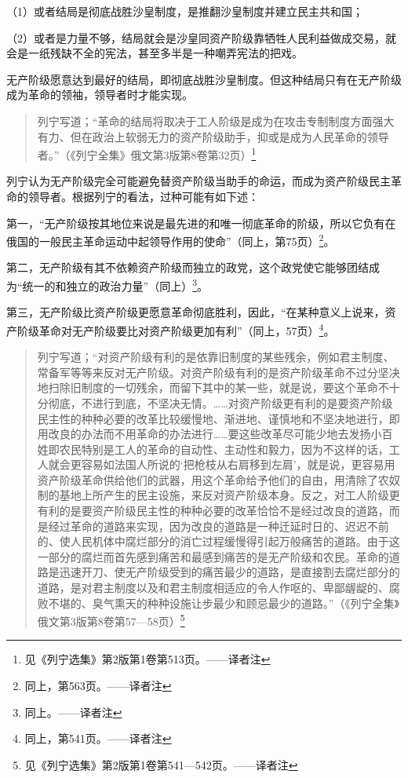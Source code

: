 （1）或者结局是彻底战胜沙皇制度，是推翻沙皇制度并建立民主共和国；

（2）或者是力量不够，结局就会是沙皇同资产阶级靠牺牲人民利益做成交易，就会是一纸残缺不全的宪法，甚至多半是一种嘲弄宪法的把戏。

无产阶级愿意达到最好的结局，即彻底战胜沙皇制度。但这种结局只有在无产阶级成为革命的领袖，领导者时才能实现。

\begin{quotation}
列宁写道；“革命的结局将取决于工人阶级是成为在攻击专制制度方面强大有力、但在政治上软弱无力的资产阶级助手，抑或是成为人民革命的领导者。”（《列宁全集》俄文第3版第8卷第32页）\footnote{见《列宁选集》第2版第1卷第513页。——译者注}
\end{quotation}

列宁认为无产阶级完全可能避免替资产阶级当助手的命运，而成为资产阶级民主革命的领导者。根据列宁的看法，过种可能有如下述：

第一，“无产阶级按其地位来说是最先进的和唯一彻底革命的阶级，所以它负有在俄国的一般民主革命运动中起领导作用的使命”（同上，第75页）\footnote{同上，第563页。——译者注}。

第二，无产阶级有其不依赖资产阶级而独立的政党，这个政党使它能够团结成为“统一的和独立的政治力量”（同上）\footnote{同上。——译者注}。

第三，无产阶级比资产阶级更愿意革命彻底胜利，因此，“在某种意义上说来，资产阶级革命对无产阶级要比对资产阶级更加有利”（同上，57页）\footnote{同上，第541页。——译者注}。

\begin{quotation}
列宁写道；“对资产阶级有利的是依靠旧制度的某些残余，例如君主制度、常备军等等来反对无产阶级。对资产阶级有利的是资产阶级革命不过分坚决地扫除旧制度的一切残余，而留下其中的某一些，就是说，要这个革命不十分彻底，不进行到底，不坚决无情。……对资产阶级更有利的是要资产阶级民主性的种种必要的改革比较缓慢地、渐进地、谨慎地和不坚决地进行，即用改良的办法而不用革命的办法进行……要这些改革尽可能少地去发扬小百姓即农民特别是工人的革命的自动性、主动性和毅力，因为不这样的话，工人就会更容易如法国人所说的‘把枪枝从右肩移到左肩’，就是说，更容易用资产阶级革命供给他们的武器，用这个革命给予他们的自由，用清除了农奴制的基地上所产生的民主设施，来反对资产阶级本身。反之，对工人阶级更有利的是要资产阶级民主性的种种必要的改革恰恰不是经过改良的道路，而是经过革命的道路来实现，因为改良的道路是一种迁延时日的、迟迟不前的、使人民机体中腐烂部分的消亡过程缓慢得引起万般痛苦的道路。由于这一部分的腐烂而首先感到痛苦和最感到痛苦的是无产阶级和农民。革命的道路是迅速开刀、使无产阶级受到的痛苦最少的道路，是直接割去腐烂部分的道路，是对君主制度以及和君主制度相适应的令人作呕的、卑鄙龌龊的、腐败不堪的、臭气熏天的种种设施让步最少和顾忌最少的道路。”（《列宁全集》俄文第3版第8卷第57—58页）\footnote{见《列宁选集》第2版第1卷第541—542页。——译者注}
\end{quotation}

